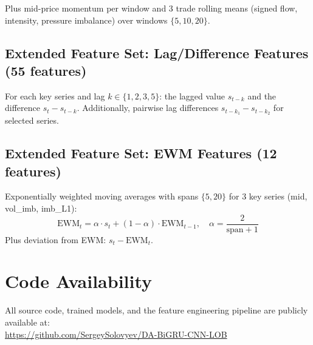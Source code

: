 \documentclass[11pt,a4paper]{article}
\begin{document}
Plus mid-price momentum per window and 3 trade rolling means (signed flow, intensity, pressure imbalance) over windows $\{5, 10, 20\}$.

\subsection{Extended Feature Set: Lag/Difference Features (55 features)}

For each key series and lag $k \in \{1, 2, 3, 5\}$: the lagged value $s_{t-k}$ and the difference $s_t - s_{t-k}$. Additionally, pairwise lag differences $s_{t-k_1} - s_{t-k_2}$ for selected series.

\subsection{Extended Feature Set: EWM Features (12 features)}

Exponentially weighted moving averages with spans $\{5, 20\}$ for 3 key series (mid, vol\_imb, imb\_L1):
\begin{equation}
    \text{EWM}_t = \alpha \cdot s_t + (1-\alpha) \cdot \text{EWM}_{t-1}, \quad \alpha = \frac{2}{\text{span}+1}
\end{equation}
Plus deviation from EWM: $s_t - \text{EWM}_t$.


\section*{Code Availability}
All source code, trained models, and the feature engineering pipeline are publicly available at:\\
\url{https://github.com/SergeySolovyev/DA-BiGRU-CNN-LOB}
\end{document}

